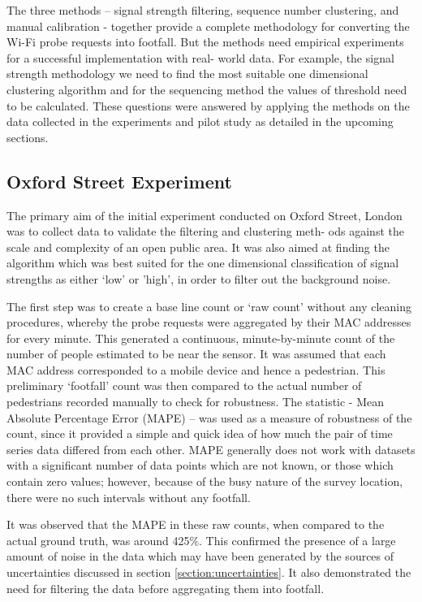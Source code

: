 The three methods – signal strength filtering, sequence number clustering, and manual calibration - together provide a complete methodology for converting the Wi-Fi probe requests into footfall.
But the methods need empirical experiments for a successful implementation with real- world data.
For example, the signal strength methodology we need to find the most suitable one dimensional clustering algorithm and for the sequencing method the values of threshold need to be calculated.
These questions were answered by applying the methods on the data collected in the experiments and pilot study as detailed in the upcoming sections.

\subsection{Oxford Street Experiment}

The primary aim of the initial experiment conducted on Oxford Street, London was to collect data to validate the filtering and clustering meth- ods against the scale and complexity of an open public area.
It was also aimed at finding the algorithm which was best suited for the one dimensional classification of signal strengths as either ‘low’ or ’high’, in order to filter out the background noise.

The first step was to create a base line count or ‘raw count’ without any cleaning procedures, whereby the probe requests were aggregated by their MAC addresses for every minute.
This generated a continuous, minute-by-minute count of the number of people estimated to be near the sensor.
It was assumed that each MAC address corresponded to a mobile device and hence a pedestrian.
This preliminary ‘footfall’ count was then compared to the actual number of pedestrians recorded manually to check for robustness.
The statistic - Mean Absolute Percentage Error (MAPE) – was used as a measure of robustness of the count, since it provided a simple and quick idea of how much the pair of time series data differed from each other.
MAPE generally does not work with datasets with a significant number of data points which are not known, or those which contain zero values; however, because of the busy nature of the survey location, there were no such intervals without any footfall.

It was observed that the MAPE in these raw counts, when compared to the actual ground truth, was around 425\%.
This confirmed the presence of a large amount of noise in the data which may have been generated by the sources of uncertainties discussed in section \ref{section:uncertainties}.
It also demonstrated the need for filtering the data before aggregating them into footfall.

